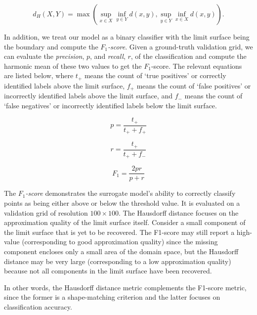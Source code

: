 \begin{equation}
d_H(X,Y) = \max \left( \sup_{x \in X} \inf_{y \in Y}
d(x,y),\sup_{y \in Y} \inf_{x \in X} d(x,y)\right).
\end{equation}

In addition, we treat our model as a binary classifier with the limit surface being the boundary and compute the \emph{$F_1$-score}.
%
Given a ground-truth validation grid, we can evaluate the \emph{precision}, $p$, and \emph{recall}, $r$, of the classification and compute the harmonic mean of these two values to get the $F_1$-score.
%
The relevant equations are listed below, where $t_+$ means the count of `true positives' or correctly identified labels above the limit surface, $f_+$ means the count of `false positives' or incorrectly identified labels above the limit surface, and $f_-$ means the count of `false negatives' or incorrectly identified labels below the limit surface.

\begin{equation}
p = \frac{t_+}{t_+ + f_+}
\end{equation}

\begin{equation}
r = \frac{t_+}{t_+ + f_-}
\end{equation}

\begin{equation}
F_1 = \frac{2pr}{p+r}
\end{equation}


The \emph{$F_1$-score} demonstrates the surrogate model's ability to correctly classify points as being either above or below the threshold value.
%
It is evaluated on a validation grid of resolution $100\times100$.
%
The Hausdorff distance focuses on the approximation quality of the limit surface itself.
%
Consider a small component of the limit surface that is yet to be recovered.
%
The F1-score may still report a high-value (corresponding to good approximation quality) since the missing component encloses only a small area of the domain space, but the Hausdorff distance may be very large (corresponding to a low approximation quality) because not all components in the limit surface have been recovered.

In other words, the Hausdorff distance metric complements the F1-score metric, since the former is a shape-matching criterion and the latter focuses on classification accuracy.
%

